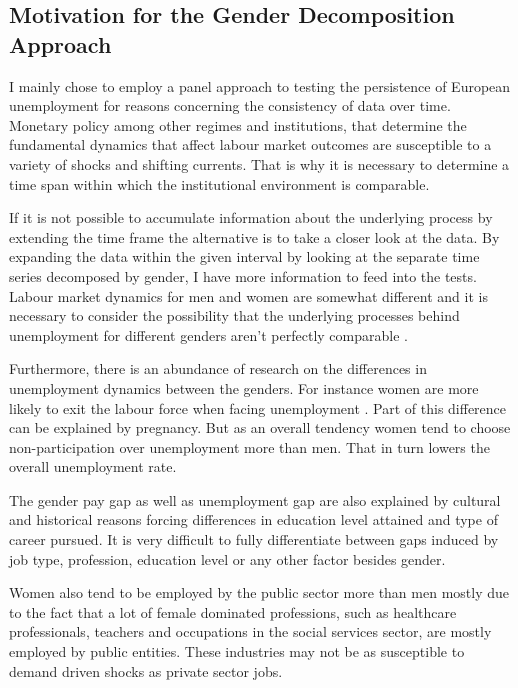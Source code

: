 \documentclass[12pt,a4paper,english]{article}
\begin{document}
\vspace{2cm}

\subsection{Motivation for the Gender Decomposition Approach}

I mainly chose to employ a panel approach to testing the persistence of European unemployment for reasons concerning the consistency of data over time. Monetary policy among other regimes and institutions, that determine the fundamental dynamics that affect labour market outcomes are susceptible to a variety of shocks and shifting currents. That is why it is necessary to determine a time span within which the institutional environment is comparable.

If it is not possible to accumulate information about the underlying process by extending the time frame the alternative is to take a closer look at the data. By expanding the data within the given interval by looking at the separate time series decomposed by gender, I have more information to feed into the tests. Labour market dynamics for men and women are somewhat different and it is necessary to consider the possibility that the underlying processes behind unemployment for different genders aren't perfectly comparable \citep{azmat2006}.

Furthermore, there is an abundance of research on the differences in unemployment dynamics between the genders. For instance women are more likely to exit the labour force when facing unemployment \citep{royalty1998, gonzalo2000}. Part of this difference can be explained by pregnancy. But as an overall tendency women tend to choose non-participation over unemployment more than men. That in turn lowers the overall unemployment rate.

The gender pay gap as well as unemployment gap are also explained by cultural and historical reasons forcing differences in education level attained and type of career pursued. It is very difficult to fully differentiate between gaps induced by job type, profession, education level or any other factor besides gender. \citep{azmat2006}

Women also tend to be employed by the public sector more than men mostly due to the fact that a lot of female dominated professions, such as healthcare professionals, teachers and occupations in the social services sector, are mostly employed by public entities. These industries may not be as susceptible to demand driven shocks as private sector jobs.
\end{document}
